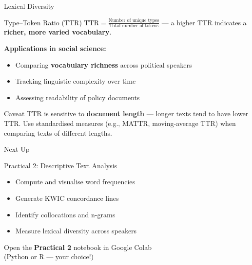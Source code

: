 \documentclass[aspectratio=169]{beamer}
\begin{document}
\begin{frame}{Lexical Diversity}
    \small
    \begin{block}{Type--Token Ratio (TTR)}
        \(\text{TTR} = \frac{\text{Number of unique types}}{\text{Total number of tokens}}\)
        \quad --- a higher TTR indicates a \textbf{richer, more varied vocabulary}.
    \end{block}

    \textbf{Applications in social science:}
    \begin{itemize}\setlength\itemsep{0pt}
        \item Comparing \textbf{vocabulary richness} across political speakers
        \item Tracking linguistic complexity over time
        \item Assessing readability of policy documents
    \end{itemize}

    \begin{alertblock}{Caveat}
        \footnotesize
        TTR is sensitive to \textbf{document length} --- longer texts tend to have lower TTR. Use standardised measures (e.g., MATTR, moving-average TTR) when comparing texts of different lengths.
    \end{alertblock}
\end{frame}

\begin{frame}{Next Up}
    \begin{center}
        {\Large \alert{Practical 2: Descriptive Text Analysis}}\\[0.5cm]
        \begin{itemize}
            \item Compute and visualise word frequencies
            \item Generate KWIC concordance lines
            \item Identify collocations and n-grams
            \item Measure lexical diversity across speakers
        \end{itemize}
        \vspace{0.5cm}
        {\normalsize Open the \textbf{Practical 2} notebook in Google Colab\\(Python or R --- your choice!)}
    \end{center}
\end{frame}
\end{document}
